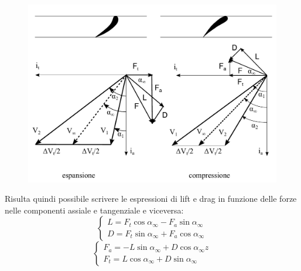 \begin{figure}
\centering
  \includegraphics[width=.7\textwidth]{fig/triang1.pdf}
\caption{}
\label{fig:triang1}
\end{figure}
Risulta quindi possibile scrivere le espressioni di lift e drag in funzione delle forze nelle componenti assiale e tangenziale e viceversa:
\begin{equation}\label{eq:c_L}
	\begin{cases} 
		L = F_t \cos \alpha_{\infty} -  F_a \sin \alpha_{\infty}\\
		D = F_t \sin \alpha_{\infty} +  F_a \cos \alpha_{\infty}
	\end{cases}
\end{equation}
\begin{equation}
	\begin{cases} 
		F_a = - L\sin \alpha_{\infty} +  D \cos \alpha_{\infty}z\\
		F_t = L \cos \alpha_{\infty} +  D \sin \alpha_{\infty}
	\end{cases}
\end{equation}
